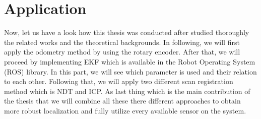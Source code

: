 \chapter{Application}\label{app}
Now, let us have a look how this thesis was conducted after studied thoroughly the related works and the theoretical backgrounds. In following, we will first apply the odometry method by using the rotary encoder. After that, we will proceed by implementing EKF which is available in the Robot Operating System (ROS) library. In this part, we will see which parameter is used and their relation to each other. Following that, we will apply two different scan registration method which is NDT and ICP. As last thing which is the main contribution of the thesis that we will combine all these there different approaches to obtain more robust localization and fully utilize every available sensor on the system.

